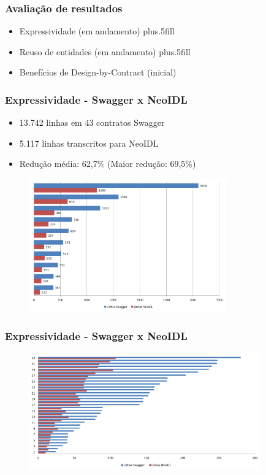 \documentclass{beamer}
\begin{document}
\begin{frame}
\frametitle{Avaliação de resultados}

\begin{itemize}
  \item Expressividade (em andamento)
  \vskip0pt plus.5fill
  \item Reuso de entidades (em andamento)
  \vskip0pt plus.5fill
  \item Benefícios de Design-by-Contract (inicial)
\end{itemize}

\end{frame}


\begin{frame}
\frametitle{Expressividade - Swagger x NeoIDL}

\begin{itemize}
  \item 13.742 linhas em 43 contratos Swagger 
  \item 5.117 linhas transcritos para NeoIDL
  \item Redução média: 62,7\% (Maior redução: 69,5\%)
\end{itemize}

\begin{figure}[h]
\includegraphics[width=8.5cm]{LinhasSwaggerNeoIDLMaiores.png}
\end{figure}

\end{frame}



\begin{frame}
\frametitle{Expressividade - Swagger x NeoIDL}

\begin{figure}[h] 
\includegraphics[width=10cm]{LinhasSwaggerNeoIDL.png}

\end{figure}

\end{frame}
\end{document}
